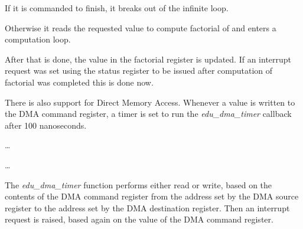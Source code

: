 \begin{codeblock}
    
\end{codeblock}

\noindent
If it is commanded to finish, it breaks out of the infinite loop.

\begin{codeblock}
    
\end{codeblock}

\noindent
Otherwise it reads the requested value to compute factorial of and enters
a computation loop.

\begin{codeblock}
    
\end{codeblock}

\noindent
After that is done, the value in the factorial register is updated. If an
interrupt request was set using the status register to be issued after
computation of factorial was completed this is done now.

\begin{codeblock}
    
\end{codeblock}

There is also support for Direct Memory Access. Whenever a value is written to
the DMA command register, a timer is set to run the \emph{edu\_dma\_timer}
callback after 100 nanoseconds.

\begin{codeblock}
    
    \dots
    
    \dots
    
\end{codeblock}

The \emph{edu\_dma\_timer} function performs either read or write, based on the
contents of the DMA command register from the address set by the DMA source
register to the address set by the DMA destination register. Then an interrupt
request is raised, based again on the value of the DMA command register.

